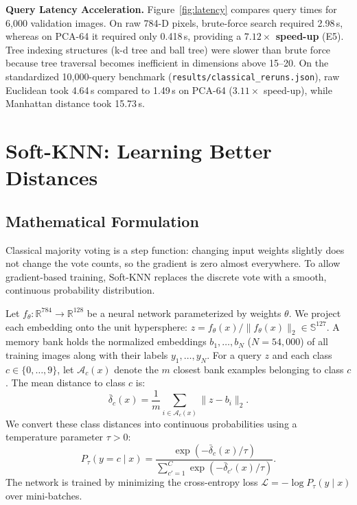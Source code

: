 \documentclass[10pt,a4paper]{article}
\newcommand{\file}[1]{\nolinkurl{#1}}
\begin{document}
\textbf{Query Latency Acceleration.} Figure~\ref{fig:latency} compares query times for 6{,}000 validation images. On raw 784-D pixels, brute-force search required 2.98\,s, whereas on PCA-64 it required only 0.418\,s, providing a \textbf{$7.12\times$ speed-up} (E5). Tree indexing structures (k-d tree and ball tree) were slower than brute force because tree traversal becomes inefficient in dimensions above 15--20. On the standardized 10{,}000-query benchmark (\file{results/classical_reruns.json}), raw Euclidean took 4.64\,s compared to 1.49\,s on PCA-64 ($3.11\times$ speed-up), while Manhattan distance took 15.73\,s.

\section{Soft-KNN: Learning Better Distances}\label{sec:softknn}
\subsection{Mathematical Formulation}\label{sec:softknn-model}
Classical majority voting is a step function: changing input weights slightly does not change the vote counts, so the gradient is zero almost everywhere. To allow gradient-based training, Soft-KNN replaces the discrete vote with a smooth, continuous probability distribution.

Let $f_\theta: \mathbb{R}^{784} \to \mathbb{R}^{128}$ be a neural network parameterized by weights $\theta$. We project each embedding onto the unit hypersphere: $z = f_\theta(x)/\lVert f_\theta(x)\rVert_2 \in \mathbb{S}^{127}$. A memory bank holds the normalized embeddings $b_1, \dots, b_N$ ($N=54{,}000$) of all training images along with their labels $y_1, \dots, y_N$. For a query $z$ and each class $c\in\{0,\dots,9\}$, let $\mathcal{A}_c(x)$ denote the $m$ closest bank examples belonging to class $c$. The mean distance to class $c$ is:
\begin{equation}
\bar\delta_c(x) = \frac{1}{m} \sum_{i \in \mathcal{A}_c(x)} \lVert z - b_i \rVert_2.
\end{equation}
We convert these class distances into continuous probabilities using a temperature parameter $\tau > 0$:
\begin{equation}
P_\tau(y = c \mid x) = \frac{\exp\left(-\bar\delta_c(x)/\tau\right)}{\sum_{c'=1}^{C} \exp\left(-\bar\delta_{c'}(x)/\tau\right)}.
\label{eq:softknn}
\end{equation}
The network is trained by minimizing the cross-entropy loss $\mathcal{L} = -\log P_\tau(y \mid x)$ over mini-batches.
\end{document}

